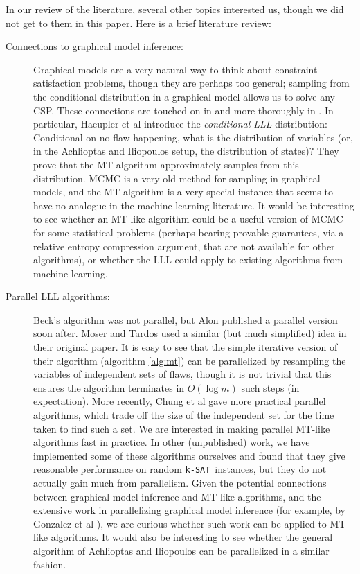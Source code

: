\documentclass[twocolumn]{article}
\newcommand{\ksat}{\texttt{k-SAT}~}
\begin{document}
In our review of the literature, several other topics interested us, though we did not get to them in this paper.  Here is a brief literature review:
\begin{description}
  \item[Connections to graphical model inference:] Graphical models are a very natural way to think about constraint satisfaction problems, though they are perhaps too general; sampling from the conditional distribution in a graphical model allows us to solve any CSP.  These connections are touched on in \cite{freer2010probabilistic} and more thoroughly in \cite{haeupler2011new}.  In particular, Haeupler et al introduce the \emph{conditional-LLL} distribution: Conditional on no flaw happening, what is the distribution of variables (or, in the Achlioptas and Iliopoulos setup, the distribution of states)?  They prove that the MT algorithm approximately samples from this distribution.  MCMC is a very old method for sampling in graphical models, and the MT algorithm is a very special instance that seems to have no analogue in the machine learning literature.  It would be interesting to see whether an MT-like algorithm could be a useful version of MCMC for some statistical problems (perhaps bearing provable guarantees, via a relative entropy compression argument, that are not available for other algorithms), or whether the LLL could apply to existing algorithms from machine learning.
  \item[Parallel LLL algorithms:] Beck's algorithm was not parallel, but Alon \cite{alon1991parallel} published a parallel version soon after.  Moser and Tardos \cite{moser2010constructive} used a similar (but much simplified) idea in their original paper.  It is easy to see that the simple iterative version of their algorithm (algorithm \ref{alg:mt}) can be parallelized by resampling the variables of independent sets of flaws, though it is not trivial that this ensures the algorithm terminates in $O(\log m)$ such steps (in expectation).  More recently, Chung et al \cite{chung2014distributed} gave more practical parallel algorithms, which trade off the size of the independent set for the time taken to find such a set.  We are interested in making parallel MT-like algorithms fast in practice.  In other (unpublished) work, we have implemented some of these algorithms ourselves and found that they give reasonable performance on random \ksat instances, but they do not actually gain much from parallelism.  Given the potential connections between graphical model inference and MT-like algorithms, and the extensive work in parallelizing graphical model inference (for example, by Gonzalez et al \cite{gonzalez2011parallel}), we are curious whether such work can be applied to MT-like algorithms.  It would also be interesting to see whether the general algorithm of Achlioptas and Iliopoulos \cite{achlioptas2014random} can be parallelized in a similar fashion.
\end{description}



\end{document}
